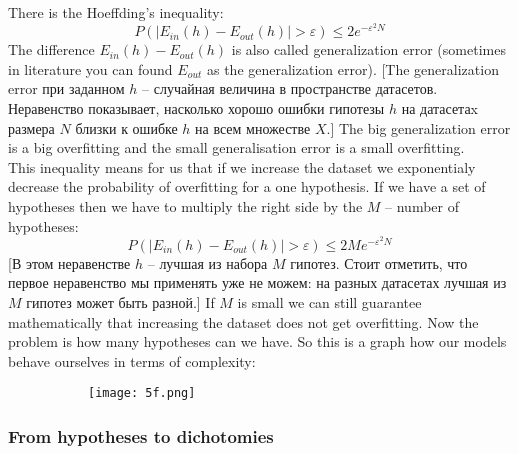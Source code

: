 There is the Hoeffding's inequality:
$$P(|E_{in}(h)-E_{out}(h)|>\varepsilon)\le2e^{-\varepsilon^2N}$$
The difference $E_{in}(h)-E_{out}(h)$ is also called generalization error (sometimes in literature you can found $E_{out}$ as the generalization error). [The generalization error при заданном $h$ -- случайная величина в пространстве датасетов. Неравенство показывает, насколько хорошо ошибки гипотезы $h$ на датасетаx размера $N$ близки к ошибке $h$ на всем множестве $X$.] The big generalization error is a big overfitting and the small generalisation error is a small overfitting.\\
This inequality means for us that if we increase the dataset we exponentialy decrease the probability of overfitting for a one hypothesis. If we have a set of hypotheses then we have to multiply the right side by the $M$ -- number of hypotheses: 
$$P(|E_{in}(h)-E_{out}(h)|>\varepsilon)\le 2Me^{-\varepsilon^2N}$$
[В этом неравенстве $h$ -- лучшая из набора $M$ гипотез. Стоит отметить, что первое неравенство мы применять уже не можем: на разных датасетах лучшая из $M$ гипотез может быть разной.] If $M$ is small we can still guarantee mathematically that increasing the dataset does not get overfitting. Now the problem is how many hypotheses can we have. So this is a graph how our models behave ourselves in terms of complexity:
\begin{figure}[h!]
  \centering
  \begin{subfigure}[l]{0.7\linewidth}
    \texttt{[image: 5f.png]}
  \end{subfigure}
\end{figure}

\subsubsection*{From hypotheses to dichotomies}

